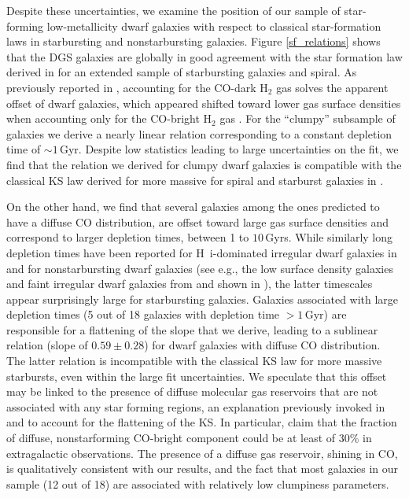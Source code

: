 \documentclass{aa}
\newcommand{\hi}{H~{\sc i}}
\begin{document}
Despite these uncertainties, we examine the position of our sample of star-forming low-metallicity dwarf galaxies with respect to classical star-formation laws in starbursting and nonstarbursting galaxies.
Figure \ref{sf_relations} shows that the DGS galaxies are globally in good agreement with the star formation law derived in \cite{Kennicutt_Reyes_2021} for an extended sample of starbursting galaxies and spiral. As previously reported in , accounting for the CO-dark H$_2$ gas solves the apparent offset of dwarf galaxies, which appeared shifted toward lower gas surface densities when accounting only for the CO-bright H$_2$ gas \citep[e.g.,][]{Cormier_2014}. For the “clumpy” subsample of galaxies we derive a nearly linear relation corresponding to a constant depletion time of $\sim 1$\,Gyr. Despite low statistics leading to large uncertainties on the fit, we find that the relation we derived for clumpy dwarf galaxies is compatible with the classical KS law derived for more massive for spiral and starburst galaxies in \cite{Kennicutt_Reyes_2021}.

On the other hand, we find that several galaxies among the ones predicted to have a diffuse CO distribution, are offset toward large gas surface densities and correspond to larger depletion times, between 1 to $10$\,Gyrs.
While similarly long depletion times have been reported for \hi-dominated irregular dwarf galaxies in \cite{Bigiel_2008} and for nonstarbursting dwarf galaxies (see e.g., the low surface density galaxies and faint irregular dwarf galaxies from \cite{Wyder_2009} and \cite{Roychowdhury_2017} shown in \cite{Reyes_Kennicutt_2019}), the latter timescales appear surprisingly large for starbursting galaxies. Galaxies associated with large depletion times (5 out of 18 galaxies with depletion time $> 1$\,Gyr) are responsible for a flattening of the slope that we derive, leading to a sublinear relation (slope of $0.59\pm0.28$) for dwarf galaxies with diffuse CO distribution. The latter relation is incompatible with the classical KS law for more massive starbursts, even within the large fit uncertainties. We speculate that this offset may be linked to the presence of diffuse molecular gas reservoirs that are not associated with any star forming regions, an explanation previously invoked in \cite{SKB_2013} and \cite{Shetty_2014} to account for the flattening of the KS. In particular, \cite{Shetty_2014} claim that the fraction of diffuse, nonstarforming CO-bright component could be at least of 30\% in extragalactic observations. The presence of a diffuse gas reservoir, shining in CO, is qualitatively consistent with our results, and the fact that most galaxies in our sample (12 out of 18) are associated with relatively low clumpiness parameters.
\end{document}
